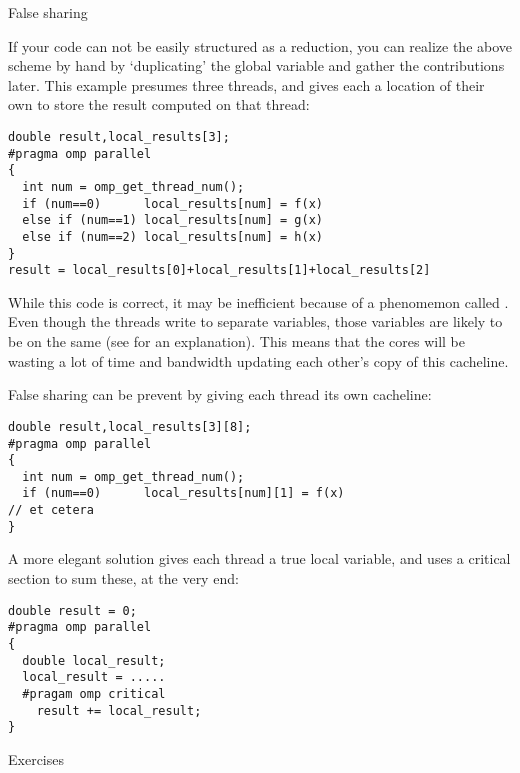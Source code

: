  {False sharing}

If your code can not be easily structured as a reduction, you can 
realize the above scheme by hand by
`duplicating' the global variable and gather the contributions later.
This example presumes three threads, and gives each a location of their
own to store the result computed on that thread:
\begin{lstlisting}[language=omp]
double result,local_results[3];
#pragma omp parallel
{
  int num = omp_get_thread_num();
  if (num==0)      local_results[num] = f(x)
  else if (num==1) local_results[num] = g(x)
  else if (num==2) local_results[num] = h(x)
}
result = local_results[0]+local_results[1]+local_results[2]
\end{lstlisting}
While this code is correct, it may be inefficient because of a
phenomemon called . Even though the threads write
to separate variables, those variables are likely to be on the same 
 (see  for an explanation).
This means that the cores will be wasting a lot of time and bandwidth updating
each other's copy of this cacheline.

False sharing can be prevent by giving each thread its own cacheline:
\begin{lstlisting}[language=omp]
double result,local_results[3][8];
#pragma omp parallel
{
  int num = omp_get_thread_num();
  if (num==0)      local_results[num][1] = f(x)
// et cetera
}
\end{lstlisting}
A more elegant solution gives each thread a true local variable,
and uses a critical section to sum these, at the very end:
\begin{lstlisting}[language=omp]
double result = 0;
#pragma omp parallel
{
  double local_result;
  local_result = .....
  #pragam omp critical
    result += local_result;
}
\end{lstlisting}

 {Exercises}

